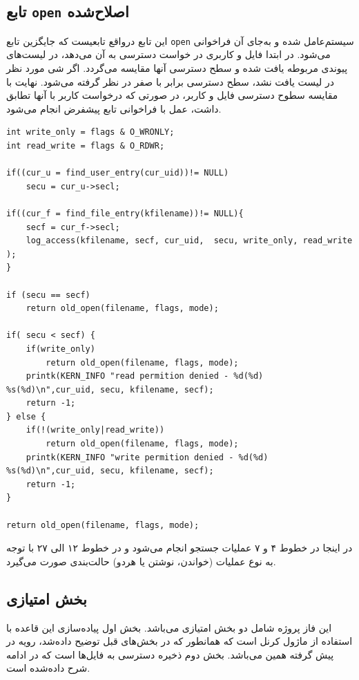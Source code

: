 \documentclass[13pt]{article}
\begin{document}
   	 \subsection{تابع \texttt{open} اصلاح‌شده}
   	 این تابع درواقع تابعیست که جایگزین تابع 
   	 \texttt{open}
   	 سیستم‌عامل شده و به‌جای آن فراخوانی می‌شود. در ابتدا فایل و کاربری در خواست دسترسی به آن می‌دهد، در لیست‌های پیوندی مربوطه یافت شده و سطح دسترسی آنها مقایسه می‌گردد. اگر شی مورد نظر در لیست یافت نشد، سطح دسترسی برابر با صفر در نظر گرفته می‌شود. نهایت با مقایسه سطوح دسترسی فایل و کاربر، در صورتی که درخواست کاربر با آنها تطابق داشت، عمل 
   	 با فراخوانی تابع پیشفرض انجام می‌شود.
   	 \begin{latin}
   	 	\begin{lstlisting}
int write_only = flags & O_WRONLY;
int read_write = flags & O_RDWR;

if((cur_u = find_user_entry(cur_uid))!= NULL)
	secu = cur_u->secl;

if((cur_f = find_file_entry(kfilename))!= NULL){
	secf = cur_f->secl;
	log_access(kfilename, secf, cur_uid,  secu, write_only, read_write );
}

if (secu == secf)
	return old_open(filename, flags, mode);

if( secu < secf) {
	if(write_only)
		return old_open(filename, flags, mode);
	printk(KERN_INFO "read permition denied - %d(%d) %s(%d)\n",cur_uid, secu, kfilename, secf);
	return -1;
} else {
	if(!(write_only|read_write))
		return old_open(filename, flags, mode);
	printk(KERN_INFO "write permition denied - %d(%d) %s(%d)\n",cur_uid, secu, kfilename, secf);
	return -1;
}

return old_open(filename, flags, mode);\end{lstlisting}
   	 \end{latin}
    \vspace{-2\baselineskip}
    در اینجا در خطوط ۴ و ۷ عملیات جستجو انجام می‌شود و در خطوط ۱۲ الی ۲۷ با توجه به نوع عملیات (خواندن، نوشتن یا هردو) حالت‌بندی صورت می‌گیرد.
     \subsection{بخش امتیازی}
     این فاز پروژه شامل دو بخش امتیازی می‌باشد. بخش اول پیاده‌سازی این قاعده با استفاده از ماژول کرنل است که همانطور که در بخش‌های قبل توضیح داده‌شد، رویه در پیش گرفته همین می‌باشد. بخش دوم ذخیره دسترسی به فایل‌‌ها است که در ادامه شرح داده‌شده است.
\end{document}
